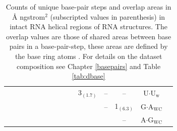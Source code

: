 \begin{table}
\begin{center}
\begin{tabular}{|c|c|c|c|c|c|c|c|c|c|c|c|c|c|c|}
 &  &  &  &  &  &  &  &  &  & 3$_{(\text{1.7})}$ & -- & -- & U$\cdot$U$_{\text{w}}$\\
 &  &  &  &  &  &  &  &  &  &  & -- & 1$_{(\text{6.3})}$ & G$\cdot$A$_{\text{WC}}$\\
 &  &  &  &  &  &  &  &  &  &  &  & -- & A$\cdot$G$_{\text{WC}}$\\
\hline
\end{tabular}
\caption{Counts  of unique base-pair  steps and  overlap areas  in \AA
  ngstrom$^2$  (subscripted  values  in  parenthesis)  in  intact  RNA
  helical regions of  RNA structures. The overlap values  are those of
  shared areas between base pairs in a base-pair-step, these areas are
  defined by  the base  ring atoms \cite{lu2003}.  For details  on the
  dataset   composition   see   Chapter  \ref{basepairs}   and   Table
  \ref{tab:dbase}}
\label{tab:91steps}
\end{center}
\end{table}



